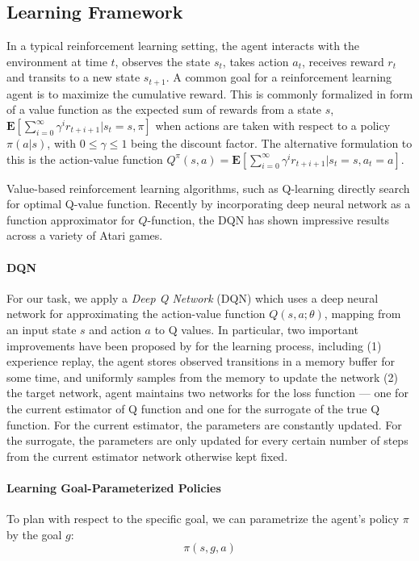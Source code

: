 \documentclass{article} %
\begin{document}
\subsection{Learning Framework}
In a typical reinforcement learning setting, the agent interacts with the environment at time $t$, observes the state $s_t$, takes action $a_t$, receives reward $r_t$ and transits to a new state $s_{t+1}$. A common goal for a reinforcement learning agent is to maximize the cumulative reward. This is commonly formalized in form of a value function as the expected sum of rewards from a state $s$, $\mathbf{E}[\sum\limits_{i=0}^\infty \gamma^i r_{t+i+1}|s_t = s,\pi]$ when actions are taken with respect to a policy $\pi(a|s)$, with $0\leq\gamma\leq 1$ being the discount factor. The alternative formulation to this is the action-value function $Q^\pi(s,a)=\mathbf{E}[\sum\limits_{i=0}^\infty \gamma^i r_{t+i+1}|s_t=s,a_t=a]$. 

Value-based reinforcement learning algorithms, such as Q-learning \citep{watkins1992q} directly search for optimal Q-value function. Recently by incorporating deep neural network as a function approximator for $Q$-function, the DQN \citep{mnih2015human} has shown impressive results across a variety of Atari games.

\paragraph{DQN}
For our task, we apply a {\em Deep Q Network\/} (DQN) which uses a deep neural network for approximating the action-value function $Q(s,a;\theta)$, mapping from an input state $s$ and action $a$ to Q values. In particular, two important improvements have been proposed by \cite{mnih2015human} for the learning process, including (1) experience replay, the agent stores observed transitions in a memory buffer for some time, and uniformly samples from the memory to update the network (2) the target network, agent maintains two networks for the loss function --- one for the current estimator of Q function and one for the surrogate of the true Q function. For the current estimator, the parameters are constantly updated. For the surrogate, the parameters are only updated for every certain number of steps from the current estimator network otherwise kept fixed.  

\paragraph{Learning Goal-Parameterized Policies}
To plan with respect to the specific goal, we can parametrize the agent's policy $\pi$ by the goal $g$: 
\begin{equation}
    \pi(s,g,a)
\end{equation}
\end{document}
